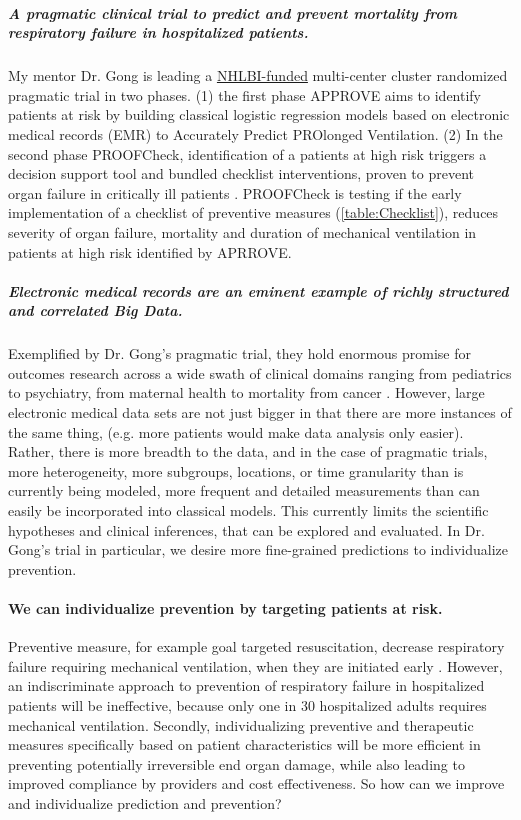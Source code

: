 \documentclass[11pt,notitlepage]{article}
\begin{document}
\subparagraph{A pragmatic clinical trial to predict and prevent mortality from respiratory failure in hospitalized patients.}  My mentor Dr. Gong is leading a \href{http://projectreporter.nih.gov/project_info_description.cfm?projectnumber=1UH2HL125119-01}{NHLBI-funded} multi-center cluster randomized pragmatic trial in two phases. (1) the first phase APPROVE aims to identify patients at risk by building classical logistic regression models based on electronic medical records (EMR) to Accurately Predict PROlonged Ventilation. (2) In the second phase PROOFCheck, identification of a patients at high risk triggers a decision support tool and bundled checklist interventions, proven to prevent organ failure in critically ill patients \cite{Levy_23103175,Lim_19783532,Barr_23269131,Girard_18191684,Hebert_9971864}. PROOFCheck is testing if the early implementation of a checklist of preventive measures (\ref{table:Checklist}), reduces severity of organ failure, mortality and duration of mechanical ventilation in patients at high risk identified by APRROVE. 

\subparagraph{Electronic medical records are an eminent example of richly structured and correlated Big Data.} Exemplified by Dr. Gong's pragmatic trial, they hold enormous promise for outcomes research across a wide swath of clinical domains ranging from pediatrics to psychiatry, from maternal health to mortality from cancer \cite{Dean_19279318,Amarasingham20940649,Welch24782349,Smeeth_15602021,Dave_20819960,Man_23272239}. However, large electronic medical data sets are not just bigger in that there are more instances of the same thing, (e.g. more patients would make data analysis only easier).  Rather, there is more breadth to the data, and in the case of pragmatic trials, more heterogeneity, more subgroups, locations, or time granularity than is currently being modeled, more frequent and detailed measurements than can easily be incorporated into classical models.  This currently limits the scientific hypotheses and clinical inferences, that can be explored and evaluated. In Dr. Gong's trial in particular, we desire more fine-grained predictions to individualize prevention.  

\paragraph*{We can individualize prevention by targeting patients at risk.}
Preventive measure, for example goal targeted resuscitation, decrease respiratory failure requiring mechanical ventilation, when they are initiated early \cite{Rivers_12594312}. However, an indiscriminate approach to prevention of respiratory failure in hospitalized patients will be ineffective, because only one in 30 hospitalized adults requires mechanical ventilation. Secondly, individualizing preventive and therapeutic measures specifically based on patient characteristics will be more efficient in preventing potentially irreversible end organ damage, while also  leading to improved compliance by providers and cost effectiveness. So how can we improve and individualize prediction and prevention? 
\end{document}
